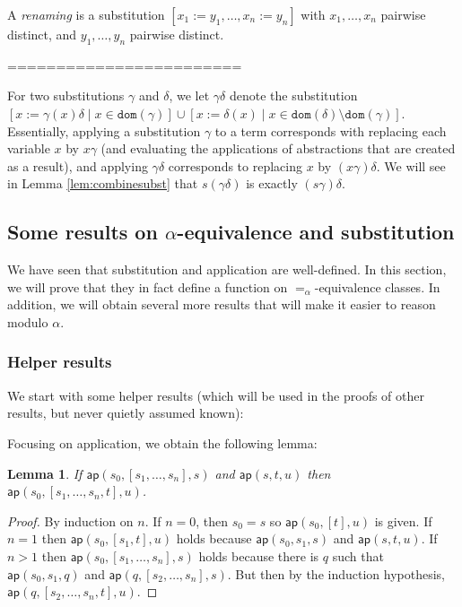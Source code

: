\documentclass{lmcs}
\theoremstyle{theorem}\newtheorem{theorem}[dummy]{Theorem}
\theoremstyle{theorem}\newtheorem{lemma}[dummy]{Lemma}
\theoremstyle{theorem}\newtheorem{corollary}[dummy]{Corollary}
\theoremstyle{definition}\newtheorem{definition}[dummy]{Definition}
\theoremstyle{definition}\newtheorem{example}[dummy]{Example}
\newcommand{\domain}{\mathtt{dom}}
\newcommand{\avar}{x}
\begin{document}
A \emph{renaming} is a substitution $[x_1:=y_1,\dots,x_n:=y_n]$ with $x_1,\dots,x_n$ pairwise
distinct, and $y_1,\dots,y_n$ pairwise distinct.

========================

For two substitutions $\gamma$ and $\delta$, we let $\gamma\delta$ denote the substitution
$[\avar := \gamma(\avar)\delta \mid \avar \in \domain(\gamma)] \cup
[\avar := \delta(\avar) \mid \avar \in \domain(\delta) \setminus \domain(\gamma)]$.
Essentially, applying a substitution $\gamma$ to a term corresponds with replacing each variable
$\avar$ by $\avar\gamma$ (and evaluating the applications of abstractions that are created as a
result), and applying $\gamma\delta$ corresponds to replacing $\avar$ by $(\avar\gamma)\delta$.
We will see in Lemma \ref{lem:combinesubst} that $s(\gamma\delta)$ is exactly $(s\gamma)\delta$.

\subsection{Some results on $\alpha$-equivalence and substitution}

We have seen that substitution and application are well-defined.  In this section, we will prove
that they in fact define a function on $=_\alpha$-equivalence classes.  In addition, we will obtain
several more results that will make it easier to reason modulo $\alpha$.

\subsubsection{Helper results}
We start with some helper results (which will be used in the proofs of other results, but never
quietly assumed known):

\newcommand{\aprel}[1]{\mathsf{ap}(#1)}
\newcommand{\subrel}[1]{\mathsf{subst}(#1)}


Focusing on application, we obtain the following lemma:

\begin{lemma}\label{lem:apadd}
If $\aprel{s_0,[s_1,\dots,s_n],s}$ and $\aprel{s,t,u}$ then $\aprel{s_0,[s_1,\dots,s_n,t],u}$.
\end{lemma}

\begin{proof}
By induction on $n$.
If $n = 0$, then $s_0 = s$ so $\aprel{s_0,[t],u}$ is given.
If $n = 1$ then $\aprel{s_0,[s_1,t],u}$ holds because $\aprel{s_0,s_1,s}$ and $\aprel{s,t,u}$.
If $n > 1$ then $\aprel{s_0,[s_1,\dots,s_n],s}$ holds because there is $q$ such that
$\aprel{s_0,s_1,q}$ and $\aprel{q,[s_2,\dots,s_n],s}$. But then by the induction hypothesis,
$\aprel{q,[s_2,\dots,s_n,t],u}$.
\end{proof}
\end{document}
